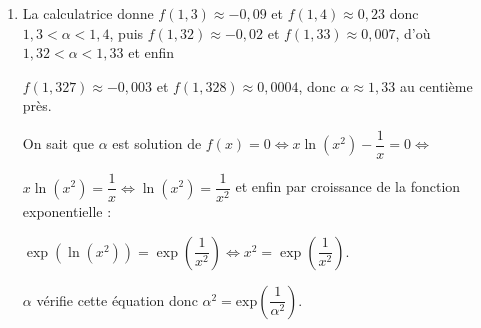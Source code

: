 \begin{enumerate}
\begin{enumerate}
		\item %
		
La calculatrice donne $f(1,3) \approx - 0,09$ et $f(1,4) \approx 0,23$ donc $1,3 < \alpha < 1,4$, puis $f(1,32) \approx -  0,02$ et $f(1,33) \approx 0,007$, d'où $1,32 < \alpha < 1,33$ et enfin 

$f(1,327) \approx - 0,003$ et $f(1,328) \approx 0,0004$, donc $\alpha \approx 1,33$ au centième près.

On sait que $\alpha$ est solution de $f(x) = 0 \iff x \ln \left(x^2 \right) - \dfrac1x = 0 \iff $

$ x\ln \left(x^2 \right) = \dfrac{1}{x}  \iff \ln \left(x^2\right) = \dfrac{1}{x^2}$ et enfin par croissance de la fonction exponentielle :

$\exp\left(\ln \left(x^2\right)\right) = \exp\left(\dfrac{1}{x^2}\right) \iff x^2 = \exp\left(\dfrac{1}{x^2}\right)$.

$\alpha$ vérifie cette équation donc $\alpha^2 = \text{exp} \left(\dfrac{1}{\alpha^2}\right)$.
	\end{enumerate}
\end{enumerate}

\bigskip

